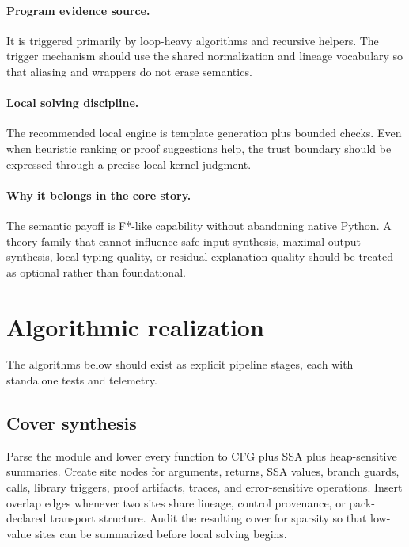 \documentclass[11pt]{report}
\theoremstyle{definition}
\theoremstyle{plain}
\begin{document}
\paragraph{Program evidence source.}
It is triggered primarily by loop-heavy algorithms and recursive helpers. The trigger mechanism should use the
shared normalization and lineage vocabulary so that aliasing and wrappers do
not erase semantics.

\paragraph{Local solving discipline.}
The recommended local engine is template generation plus bounded checks. Even when heuristic ranking or
proof suggestions help, the trust boundary should be expressed through a
precise local kernel judgment.

\paragraph{Why it belongs in the core story.}
The semantic payoff is F*-like capability without abandoning native Python. A theory family that cannot influence safe
input synthesis, maximal output synthesis, local typing quality, or residual
explanation quality should be treated as optional rather than foundational.


\section{Algorithmic realization}

The algorithms below should exist as explicit pipeline stages, each with standalone tests and telemetry.
\subsection{Cover synthesis}

\begin{algorithm}[H]
\caption{Sheaf-descent stage: Cover synthesis}
\begin{algorithmic}[1]
\State Parse the module and lower every function to CFG plus SSA plus heap-sensitive summaries.
\State Create site nodes for arguments, returns, SSA values, branch guards, calls, library triggers, proof artifacts, traces, and error-sensitive operations.
\State Insert overlap edges whenever two sites share lineage, control provenance, or pack-declared transport structure.
\State Audit the resulting cover for sparsity so that low-value sites can be summarized before local solving begins.
\end{algorithmic}
\end{algorithm}
\end{document}

